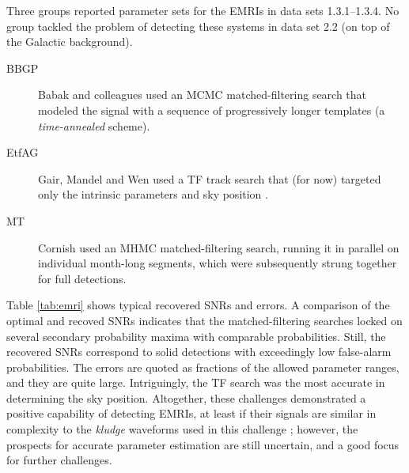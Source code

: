 \documentclass{iopart}
\begin{document}
Three groups reported parameter sets for the EMRIs in data sets 1.3.1--1.3.4. No group tackled the problem of detecting these systems in data set 2.2 (on top of the Galactic background).
%
\begin{description}
\item[BBGP] Babak and colleagues used an MCMC matched-filtering search that modeled the signal with a sequence of progressively longer templates (a \emph{time-annealed} scheme).
%
\item[EtfAG] Gair, Mandel and Wen used a TF track search that (for now) targeted only the intrinsic parameters and sky position \cite{gair}.
%
\item[MT] Cornish used an MHMC matched-filtering search, running it in parallel on individual month-long segments, which were subsequently strung together for full detections.
\end{description}
%
Table \ref{tab:emri} shows typical recovered SNRs and errors. A comparison of the optimal and recoved SNRs indicates that the matched-filtering searches locked on several secondary probability maxima with comparable probabilities. Still, the recovered SNRs correspond to solid detections with exceedingly low false-alarm probabilities. The errors are quoted as fractions of the allowed parameter ranges, and they are quite large. Intriguingly, the TF search was the most accurate in determining the sky position. Altogether, these challenges demonstrated a positive capability of detecting EMRIs, at least if their signals are similar in complexity to the \emph{kludge} waveforms used in this challenge \cite{mldcgwdaw2}; however, the prospects for accurate parameter estimation are still uncertain, and a good focus for further challenges.
%
\end{document}

